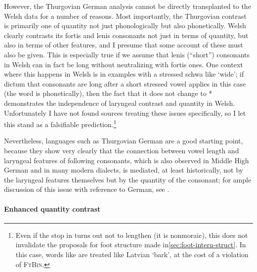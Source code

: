 However, the Thurgovian German analysis cannot be directly transplanted to the Welsh data for a number of reasons. Most importantly, the Thurgovian contrast is primarily one of quantity not just phonologically but also phonetically. Welsh clearly contrasts its fortis and lenis consonants not just in terms of quantity, but also in terms of other features, and I presume that some account of these must also be given. This is especially true if we assume that lenis (\ie \enquote{short}) consonants in Welsh can in fact be long without neutralizing with fortis ones. One context where this happens in Welsh is in examples with a stressed schwa like \ipa{[ˈɬədan]} `wide'; if  dictum that consonants are long after a short stressed vowel applies in this case (\ie the word is  phonetically), then the fact that it does not change to *\ipa{[ˈɬətan]} demonstrates the independence of laryngeal contrast and quantity in Welsh. Unfortunately I have not found sources treating these issues specifically, so I let this stand as a falsifiable prediction.\footnote{Even if the stop in \ipa{[ˈɬədan]} turns out not to lengthen (\ie it is nonmoraic), this does not invalidate the proposals for foot structure made in\cref{sec:foot-intern-struct}. In this case, words like \ipa{[ˈɬədan]} are treated like Latvian \ipa{[ˈmizɑ]} `bark', at the cost of a violation of \textsc{FtBin}.}

Nevertheless, languages such as Thurgovian German are a good starting point, because they show very clearly that the connection between vowel length and laryngeal features of following consonants, which is also observed in Middle High German and in many modern dialects, is mediated, at least historically, not by the laryngeal features themselves but by the quantity of the consonant; for ample discussion of this issue with reference to German, see \citet{seiler09:_sound}.

\paragraph{Enhanced quantity contrast}
\label{sec:enhanc-qual-contr}

